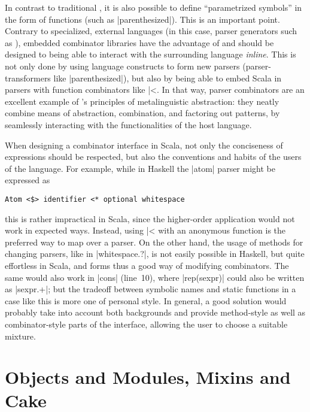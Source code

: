 In contrast to traditional , it is also possible to define \enquote{parametrized
  symbols} in the form of functions (such as |parenthesized|). This is an important point. Contrary
to specialized, external languages (in this case, parser generators such as ),
embedded combinator libraries have the advantage of and should be designed to being able to interact
with the surrounding language \emph{inline}. This is not only done by using language constructs to
form new parsers (parser-transformers like |parenthesized|), but also by being able to embed Scala
in parsers with function combinators like |^^|. In that way, parser combinators are an excellent
example of 's principles of metalinguistic abstraction: they neatly combine means of
abstraction, combination, and factoring out patterns, by seamlessly interacting with the
functionalities of the host language.

When designing a combinator interface in Scala, not only the conciseness of expressions should be
respected, but also the conventions and habits of the users of the language. For example, while in
Haskell the |atom| parser might be expressed as
\begin{lstlisting}[language={[Modern]Haskell}]
  Atom <$> identifier <* optional whitespace
\end{lstlisting}
this is rather impractical in Scala, since the higher-order application would not work in expected
ways. Instead, using |^^| with an anonymous function is the preferred way to map over a parser. On
the other hand, the usage of methods for changing parsers, like in |whitespace.?|, is not easily
possible in Haskell, but quite effortless in Scala, and forms thus a good way of modifying
combinators. The same would also work in |cons| (line~10), where |rep(sexpr)| could also be written
as |sexpr.+|; but the tradeoff between symbolic names and static functions in a case like this is
more one of personal style. In general, a good solution would probably take into account both
backgrounds and provide method-style as well as combinator-style parts of the interface, allowing
the user to choose a suitable mixture.


\section{Objects and Modules, Mixins and Cake}
\label{sec:modules}

